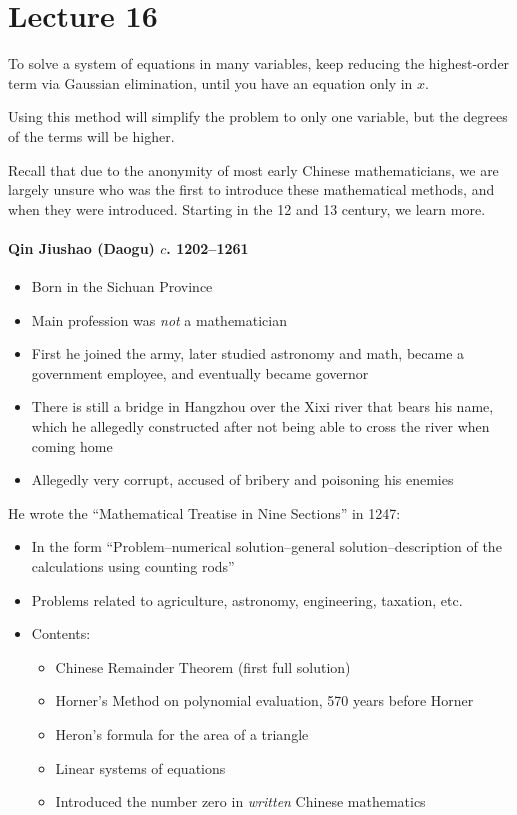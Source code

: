 \documentclass[class=article, crop=false]{standalone}
\begin{document}
  \section{Lecture 16}
  To solve a system of equations in many variables, keep reducing the highest-order term via Gaussian elimination, until you have an equation only in $x$.
  \begin{note}{}
    Using this method will simplify the problem to only one variable, but the degrees of the terms will be higher.
  \end{note}
  Recall that due to the anonymity of most early Chinese mathematicians, we are largely unsure who was the first to introduce these mathematical methods, and when they were introduced. Starting in the 12 and 13 century, we learn more. \par
  \paragraph{Qin Jiushao (Daogu) $c$. 1202--1261}
  \begin{itemize}
    \item Born in the Sichuan Province
    \item Main profession was \emph{not} a mathematician
    \item First he joined the army, later studied astronomy and math, became a government employee, and eventually became governor
    \item There is still a bridge in Hangzhou over the Xixi river that bears his name, which he allegedly constructed after not being able to cross the river when coming home
    \item Allegedly very corrupt, accused of bribery and poisoning his enemies
  \end{itemize}
  He wrote the ``Mathematical Treatise in Nine Sections'' in 1247:
  \begin{itemize}
    \item In the form ``Problem--numerical solution--general solution--description of the calculations using counting rods''
    \item Problems related to agriculture, astronomy, engineering, taxation, etc.
    \item Contents:
    \begin{itemize}
      \item Chinese Remainder Theorem (first full solution)
      \item Horner's Method on polynomial evaluation, 570 years before Horner
      \item Heron's formula for the area of a triangle
      \item Linear systems of equations
      \item Introduced the number zero in \emph{written} Chinese mathematics
    \end{itemize}
  \end{itemize}
\end{document}
